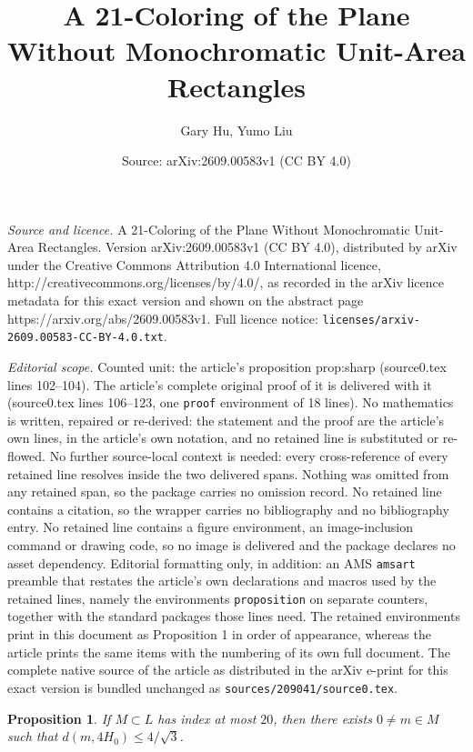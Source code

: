 \documentclass[10pt,a4paper]{amsart}
\title{A 21-Coloring of the Plane Without Monochromatic Unit-Area Rectangles}
\author{Gary Hu, Yumo Liu}
\date{Source: arXiv:2609.00583v1 (CC BY 4.0)}
\newtheorem{proposition}{Proposition}
\begin{document}
\maketitle

\noindent\emph{Source and licence.} A 21-Coloring of the Plane Without Monochromatic Unit-Area Rectangles. Version arXiv:2609.00583v1 (CC BY 4.0), distributed by arXiv under the Creative Commons Attribution 4.0 International licence, http://creativecommons.org/licenses/by/4.0/, as recorded in the arXiv licence metadata for this exact version and shown on the abstract page https://arxiv.org/abs/2609.00583v1. Full licence notice: \texttt{licenses/arxiv-2609.00583-CC-BY-4.0.txt}.\par\smallskip

\noindent\textit{Editorial scope.} Counted unit: the article's proposition prop:sharp (source0.tex lines 102--104). The article's complete original proof of it is delivered with it (source0.tex lines 106--123, one \texttt{proof} environment of 18 lines). No mathematics is written, repaired or re-derived: the statement and the proof are the article's own lines, in the article's own notation, and no retained line is substituted or re-flowed.  No further source-local context is needed: every cross-reference of every retained line resolves inside the two delivered spans.  Nothing was omitted from any retained span, so the package carries no omission record.  No retained line contains a citation, so the wrapper carries no bibliography and no bibliography entry.  No retained line contains a figure environment, an image-inclusion command or drawing code, so no image is delivered and the package declares no asset dependency.  Editorial formatting only, in addition: an AMS \texttt{amsart} preamble that restates the article's own declarations and macros used by the retained lines, namely the environments \texttt{proposition} on separate counters, together with the standard packages those lines need.  The retained environments print in this document as Proposition 1 in order of appearance, whereas the article prints the same items with the numbering of its own full document.  The complete native source of the article as distributed in the arXiv e-print for this exact version is bundled unchanged as \texttt{sources/209041/source0.tex}.
\begin{proposition}\label{prop:sharp}
If $M\subset L$ has index at most $20$, then there exists $0\ne m\in M$ such that $d(m,4H_0)\le4/\sqrt3$.
\end{proposition}
\end{document}
